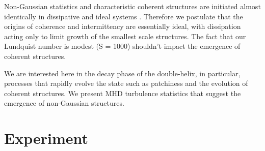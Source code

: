 \documentclass[12pt]{iopart}
\begin{document}
Non-Gaussian statistics and characteristic coherent structures are initiated almost identically in dissipative and ideal systems \cite{Wan09}. Therefore we postulate that the origins of coherence and intermittency are essentially ideal, with dissipation acting only to limit growth of the smallest scale structures.  The fact that our Lundquist number is modest (S = 1000) shouldn't impact the emergence of coherent structures.

We are interested here in the decay phase of the double-helix, in particular, processes that rapidly evolve the state such as patchiness and the evolution of coherent structures.  We present MHD turbulence statistics that suggest the emergence of non-Gaussian structures.


\section{Experiment}
\end{document}
